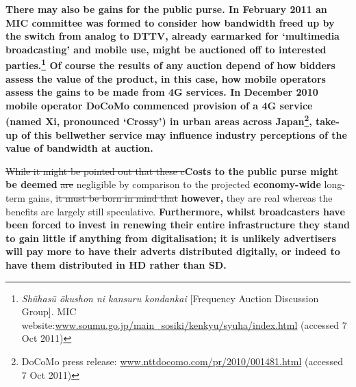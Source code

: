 \documentclass[11pt, oneside, a4paper, headsepline]{scrartcl}
\begin{document}

{\bf There may also be gains for the public purse. In February 2011 an MIC committee was formed to consider how bandwidth freed up by the switch from analog to DTTV, already earmarked for `multimedia broadcasting' and mobile use, might be auctioned off to interested parties.\footnote{\emph{Shūhasū ōkushon ni kansuru kondankai} [Frequency Auction Discussion Group]. MIC website:\url{www.soumu.go.jp/main_sosiki/kenkyu/syuha/index.html} (accessed 7 Oct 2011)} Of course the results of any auction depend of how bidders assess the value of the product, in this case, how mobile operators assess the gains to be made from 4G services. In December 2010 mobile operator DoCoMo commenced provision of a 4G service (named Xi, pronounced `Crossy') in urban areas across Japan\footnote{DoCoMo press release: \url{www.nttdocomo.com/pr/2010/001481.html} (accessed 7 Oct 2011)}, take-up of this bellwether service may influence industry perceptions of the value of bandwidth at auction. 
}

\bigskip

\st{While it might be pointed out that these c}\textbf{Costs to the public purse might be deemed} \st{are} negligible by comparison to the projected \textbf{economy-wide} long-term gains, \st{it must be born in mind that} \textbf{however,} they are real whereas the benefits are largely still speculative. {\bf Furthermore, whilst broadcasters have been forced to invest in renewing their entire infrastructure they stand to gain little if anything from digitalisation; it is unlikely advertisers will pay more to have their adverts distributed digitally, or indeed to have them distributed in HD rather than SD.} %
\end{document}
